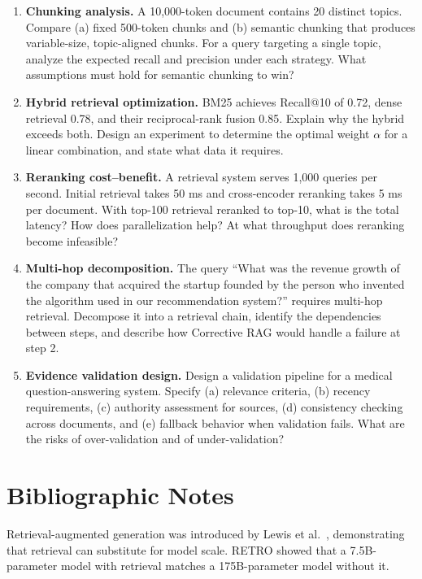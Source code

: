 \documentclass[11pt]{book}
\begin{document}
\begin{enumerate}
\item \textbf{Chunking analysis.} A 10{,}000-token document contains 20 distinct topics. Compare (a) fixed 500-token chunks and (b) semantic chunking that produces variable-size, topic-aligned chunks. For a query targeting a single topic, analyze the expected recall and precision under each strategy. What assumptions must hold for semantic chunking to win?

\item \textbf{Hybrid retrieval optimization.} BM25 achieves Recall@10 of 0.72, dense retrieval 0.78, and their reciprocal-rank fusion 0.85. Explain why the hybrid exceeds both. Design an experiment to determine the optimal weight $\alpha$ for a linear combination, and state what data it requires.

\item \textbf{Reranking cost--benefit.} A retrieval system serves 1{,}000 queries per second. Initial retrieval takes 50 ms and cross-encoder reranking takes 5 ms per document. With top-100 retrieval reranked to top-10, what is the total latency? How does parallelization help? At what throughput does reranking become infeasible?

\item \textbf{Multi-hop decomposition.} The query ``What was the revenue growth of the company that acquired the startup founded by the person who invented the algorithm used in our recommendation system?'' requires multi-hop retrieval. Decompose it into a retrieval chain, identify the dependencies between steps, and describe how Corrective RAG would handle a failure at step 2.

\item \textbf{Evidence validation design.} Design a validation pipeline for a medical question-answering system. Specify (a) relevance criteria, (b) recency requirements, (c) authority assessment for sources, (d) consistency checking across documents, and (e) fallback behavior when validation fails. What are the risks of over-validation and of under-validation?
\end{enumerate}

\section*{Bibliographic Notes}

Retrieval-augmented generation was introduced by Lewis et al.\ \cite{lewis2020rag}, demonstrating that retrieval can substitute for model scale. RETRO \cite{retro2022} showed that a 7.5B-parameter model with retrieval matches a 175B-parameter model without it.
\end{document}
